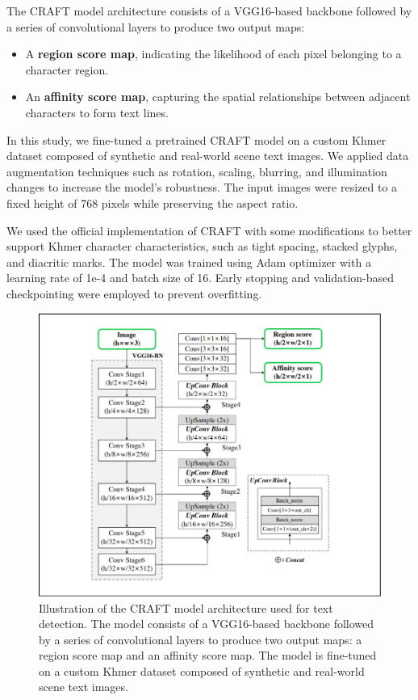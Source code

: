 The CRAFT model architecture consists of a VGG16-based backbone followed by a series 
of convolutional layers to produce two output maps:
\begin{itemize}
\item A \textbf{region score map}, indicating the likelihood of each pixel belonging 
to a character region.
\item An \textbf{affinity score map}, capturing the spatial relationships between 
adjacent characters to form text lines.
\end{itemize}

In this study, we fine-tuned a pretrained CRAFT model on a custom Khmer dataset 
composed of synthetic and real-world scene text images. We applied data augmentation 
techniques such as rotation, scaling, blurring, and illumination changes to increase 
the model's robustness. The input images were resized to a fixed height of 768 pixels 
while preserving the aspect ratio.

We used the official implementation of CRAFT with some modifications to better support
Khmer character characteristics, such as tight spacing, stacked glyphs, and diacritic 
marks. The model was trained using Adam optimizer with a learning rate of 1e-4 and batch 
size of 16. Early stopping and validation-based checkpointing were employed to 
prevent overfitting.

\begin{figure}[H]
    \centering
    \includegraphics[width=\textwidth]{figures/craft_model.png}
    \caption{Illustration of the CRAFT model architecture used for text detection. 
    The model consists of a VGG16-based backbone followed by a series of 
    convolutional layers to produce two output maps: a region score map and 
    an affinity score map. The model is fine-tuned on a custom Khmer dataset 
    composed of synthetic and real-world scene text images. 
    \citet{baek2019craft}}
    \label{fig:craft-model}
\end{figure}

